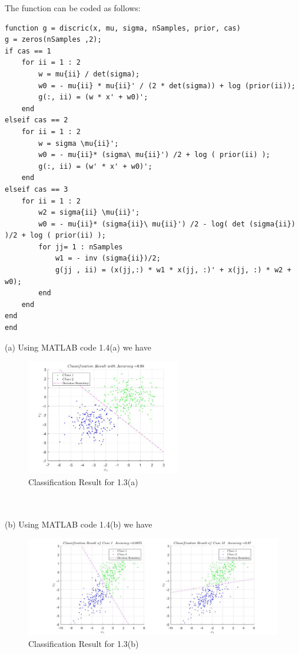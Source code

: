 \documentclass[12pt]{article}
\begin{document}
The function can be coded as follows:
\begin{lstlisting}
function g = discric(x, mu, sigma, nSamples, prior, cas)
g = zeros(nSamples ,2);
if cas == 1
    for ii = 1 : 2
        w = mu{ii} / det(sigma);
        w0 = - mu{ii} * mu{ii}' / (2 * det(sigma)) + log (prior(ii));
        g(:, ii) = (w * x' + w0)';
    end
elseif cas == 2
    for ii = 1 : 2
        w = sigma \mu{ii}';
        w0 = - mu{ii}* (sigma\ mu{ii}') /2 + log ( prior(ii) );
        g(:, ii) = (w' * x' + w0)';
    end
elseif cas == 3
    for ii = 1 : 2
        w2 = sigma{ii} \mu{ii}';
        w0 = - mu{ii}* (sigma{ii}\ mu{ii}') /2 - log( det (sigma{ii}) )/2 + log ( prior(ii) );
        for jj= 1 : nSamples
            w1 = - inv (sigma{ii})/2;
            g(jj , ii) = (x(jj,:) * w1 * x(jj, :)' + x(jj, :) * w2 + w0);
        end
    end
end
end
\end{lstlisting}

\noindent (a) Using MATLAB code 1.4(a) we have

\begin{figure}[H]
\centering
\includegraphics[width=0.6\textwidth]{14a.jpg}
\caption{\label{14a}Classification Result for 1.3(a)}
\end{figure}

\text{ }\\
\\
\noindent(b) Using MATLAB code 1.4(b) we have

\begin{figure}[H]
\centering
\includegraphics[width=1\textwidth]{14b.jpg}
\caption{\label{14b}Classification Result for 1.3(b)}
\end{figure}
\end{document}
